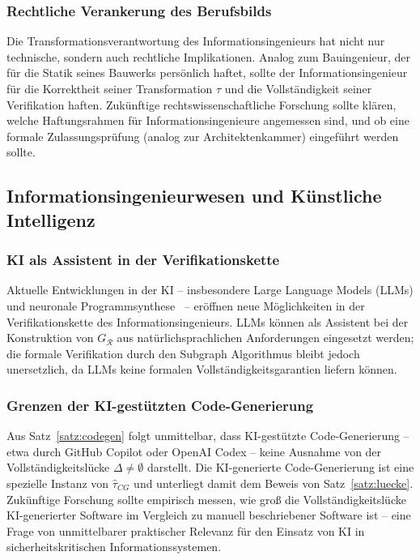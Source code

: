 ﻿\documentclass[a4paper,12pt]{article}
\theoremstyle{definition}
\begin{document}
\subsubsection{Rechtliche Verankerung des Berufsbilds}

Die Transformationsverantwortung des Informationsingenieurs hat nicht nur technische,
sondern auch rechtliche Implikationen. Analog zum Bauingenieur, der für die Statik
seines Bauwerks persönlich haftet, sollte der Informationsingenieur für die Korrektheit
seiner Transformation $\tau$ und die Vollständigkeit seiner Verifikation haften.
Zukünftige rechtswissenschaftliche Forschung sollte klären, welche Haftungsrahmen
für Informationsingenieure angemessen sind, und ob eine formale Zulassungsprüfung
(analog zur Architektenkammer) eingeführt werden sollte.

\subsection{Informationsingenieurwesen und Künstliche Intelligenz}

\subsubsection{KI als Assistent in der Verifikationskette}

Aktuelle Entwicklungen in der KI -- insbesondere Large Language Models (LLMs) und
neuronale Programmsynthese~\cite{chen2021} -- eröffnen neue Möglichkeiten in der
Verifikationskette des Informationsingenieurs. LLMs können als Assistent bei der
Konstruktion von $G_\mathcal{R}$ aus natürlichsprachlichen Anforderungen eingesetzt
werden; die formale Verifikation durch den Subgraph Algorithmus bleibt jedoch
unersetzlich, da LLMs keine formalen Vollständigkeitsgarantien liefern können.

\subsubsection{Grenzen der KI-gestützten Code-Generierung}

Aus Satz~\ref{satz:codegen} folgt unmittelbar, dass KI-gestützte Code-Generierung --
etwa durch GitHub Copilot oder OpenAI Codex -- keine Ausnahme von der Vollständigkeitslücke
$\Delta \neq \emptyset$ darstellt. Die KI-generierte Code-Generierung ist eine
spezielle Instanz von $\hat{\tau}_{CG}$ und unterliegt damit dem Beweis von
Satz~\ref{satz:luecke}. Zukünftige Forschung sollte empirisch messen, wie groß die
Vollständigkeitslücke KI-generierter Software im Vergleich zu manuell beschriebener
Software ist -- eine Frage von unmittelbarer praktischer Relevanz für den Einsatz von
KI in sicherheitskritischen Informationssystemen.
\end{document}
